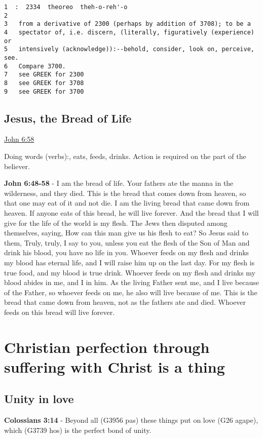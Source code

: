 \documentclass[11pt]{article}
\begin{document}
\begin{verbatim}
1  :  2334  theoreo  theh-o-reh'-o
2  
3   from a derivative of 2300 (perhaps by addition of 3708); to be a
4   spectator of, i.e. discern, (literally, figuratively (experience) or
5   intensively (acknowledge)):--behold, consider, look on, perceive, see.
6   Compare 3700.
7   see GREEK for 2300
8   see GREEK for 3708
9   see GREEK for 3700
\end{verbatim}

\subsection{Jesus, the Bread of Life}
\label{sec:org297238f}
\url{John 6:58}

Doing words (verbs):, eats, feeds, drinks.
Action is required on the part of the believer.

\textbf{John 6:48-58} - I am the bread of life.  Your fathers ate the manna in the wilderness, and they died.  This is the bread that comes down from heaven, so that one may eat of it and not die.  I am the living bread that came down from heaven. If anyone eats of this bread, he will live forever. And the bread that I will give for the life of the world is my flesh.  The Jews then disputed among themselves, saying, How can this man give us his flesh to eat?  So Jesus said to them, Truly, truly, I say to you, unless you eat the flesh of the Son of Man and drink his blood, you have no life in you.  Whoever feeds on my flesh and drinks my blood has eternal life, and I will raise him up on the last day.  For my flesh is true food, and my blood is true drink.  Whoever feeds on my flesh and drinks my blood abides in me, and I in him.  As the living Father sent me, and I live because of the Father, so whoever feeds on me, he also will live because of me.  This is the bread that came down from heaven, not as the fathers ate and died. Whoever feeds on this bread will live forever.

\section{Christian perfection through suffering with Christ is a thing}
\label{sec:org21ccd5e}
\subsection{Unity in love}
\label{sec:org5227a62}
\textbf{Colossians 3:14} - Beyond all (G3956 pas) these things put on love (G26 agape), which (G3739 hos) is the perfect bond of unity.
\end{document}
